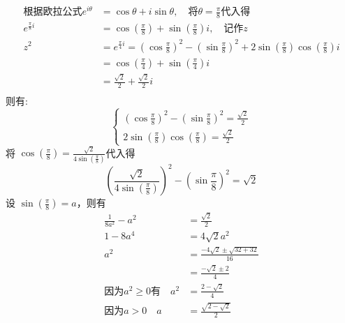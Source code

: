 \documentclass[answers]{exam}
\begin{document}
\begin{questions}
	\begin{solution}
		\begin{align*}
			\text{根据欧拉公式} e^{i\theta} & = \cos\theta + i\sin\theta,
			\quad\text{将}\theta = \frac{\pi}{8} \text{代入得}                                                   \\
			e^{\frac{\pi}{8}i}              & =
			\cos\left(\frac{\pi}{8}\right) + \sin\left(\frac{\pi}{8}\right)i,\quad \text{记作}z                  \\
			z^2                             & = e^{\frac{\pi}{4}i}
			= \left(\cos\frac{\pi}{8}\right)^2 - \left(\sin\frac{\pi}{8}\right)^2 +
			2\sin\left(\frac{\pi}{8}\right)\cos\left(\frac{\pi}{8}\right)i                                       \\
			                                & = \cos\left(\frac{\pi}{4}\right) + \sin\left(\frac{\pi}{4}\right)i \\
			                                & = \frac{\sqrt{2}}{2} + \frac{\sqrt{2}}{2}i                         \\
		\end{align*}
		则有:
		\begin{equation*}
			\begin{cases}
				\left(\cos\frac{\pi}{8}\right)^2 - \left(\sin\frac{\pi}{8}\right)^2  = \frac{\sqrt{2}}{2} \\
				2\sin\left(\frac{\pi}{8}\right)\cos\left(\frac{\pi}{8}\right) = \frac{\sqrt{2}}{2}
			\end{cases}
		\end{equation*}
		将 \(\displaystyle \cos\left(\frac{\pi}{8}\right) = \frac{\sqrt{2}}{4\sin\left(\frac{\pi}{8}\right)}\)代入得
		\[
			\left(\frac{\sqrt{2}}{4\sin\left(\frac{\pi}{8}\right)}\right)^2 - \left(\sin\frac{\pi}{8}\right)^2  = \sqrt{2}
		\]
		设 \( \sin\left(\frac{\pi}{8}\right) = a \)，则有
		\begin{align*}
			\frac{1}{8a^2} - a^2 & = \frac{\sqrt{2}}{2}                       \\
			1 - 8a^4             & = 4\sqrt{2}a^2                             \\
			a^2                  & = \frac{-4\sqrt{2} \pm \sqrt{32 + 32}}{16} \\
			                     & = \frac{-\sqrt{2} \pm 2}{4}                \\
			\text{因为}a^2 \ge 0 \text{有}\quad
			a^2                  & = \frac{2-\sqrt{2}}{4}                     \\
			\text{因为} a > 0 \quad
			a                    & = \frac{\sqrt{2-\sqrt{2}}}{2}
		\end{align*}


\end{solution}
\end{questions}
\end{document}
